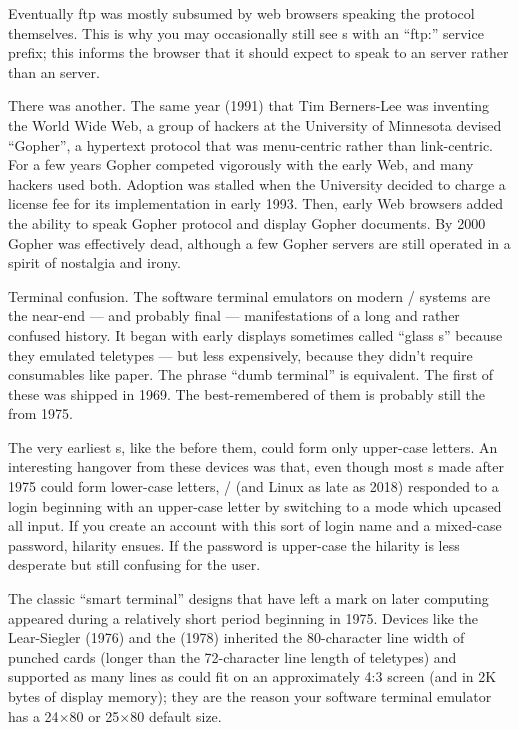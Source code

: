 Eventually ftp was mostly subsumed by web browsers speaking the  protocol
themselves. This is why you may occasionally still see s with an ``ftp:''
service prefix; this informs the browser that it should expect to speak to an
 server rather than an  server.

There was another. The same year (1991) that Tim Berners-Lee was inventing the
World Wide Web, a group of hackers at the University of Minnesota devised
``Gopher'', a hypertext protocol that was menu-centric rather than link-centric.
For a few years Gopher competed vigorously with the early Web, and many hackers
used both. Adoption was stalled when the University decided to charge a license
fee for its implementation in early 1993. Then, early Web browsers added the
ability to speak Gopher protocol and display Gopher documents. By 2000 Gopher
was effectively dead, although a few Gopher servers are still operated in a
spirit of nostalgia and irony.

\sect Terminal confusion.
The software terminal emulators on modern \UNIX/ systems are the near-end --- and
probably final --- manifestations of a long and rather confused history. It began
with early displays sometimes called ``glass s'' because they emulated
teletypes --- but less expensively, because they didn't require consumables like
paper. The phrase ``dumb terminal'' is equivalent. The first of these was shipped
in 1969. The best-remembered of them is probably still the  from 1975.

The very earliest s, like the  before them, could form only upper-case
letters. An interesting hangover from these devices was that, even though most
s made after 1975 could form lower-case letters, \UNIX/ (and Linux as late as
2018) responded to a login beginning with an upper-case letter by switching to
a mode which upcased all input. If you create an account with this sort of
login name and a mixed-case password, hilarity ensues. If the password is
upper-case the hilarity is less desperate but still confusing for the user.

The classic ``smart terminal''  designs that have left a mark on later
computing appeared during a relatively short period beginning in 1975. Devices
like the Lear-Siegler  (1976) and the  (1978) inherited the
80-character line width of punched cards (longer than the 72-character line
length of teletypes) and supported as many lines as could fit on an
approximately 4:3 screen (and in 2K bytes of display memory); they are the
reason your software terminal emulator has a 24$\times$80 or 25$\times$80 default size.

